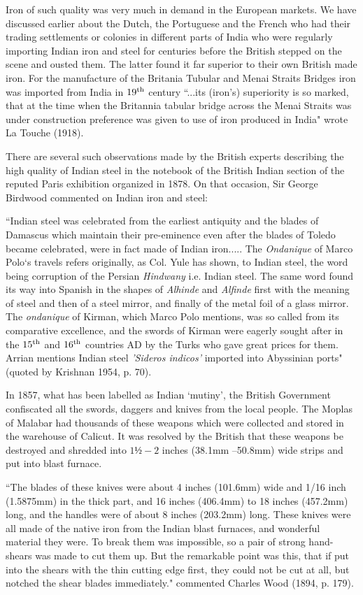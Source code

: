 Iron of such quality was very much in demand in the European markets.  We have discussed earlier about the Dutch, the Portuguese and the French who had their trading settlements or colonies in different parts of India who were regularly importing Indian iron and steel for centuries before the British stepped on the scene and ousted them.  The latter found it far superior to their own British made iron.  For the manufacture of the Britania Tubular and Menai Straits Bridges iron was imported from India in $19^{\rm th}$ century ``...its (iron's) superiority is so marked, that at the time when the Britannia tabular bridge across the Menai Straits was under construction preference was given to use of iron produced in India" wrote La Touche (1918).

There are several such observations made by the British experts describing the high quality of Indian steel in the notebook of the British Indian section of the reputed Paris exhibition organized in 1878. On that occasion, Sir George Birdwood commented on Indian iron and steel:

{\footnotesize{``Indian steel was celebrated from the earliest antiquity and the blades of Damascus which maintain their pre-eminence even after the blades of Toledo became celebrated, were in fact made of Indian iron..... The {\it Ondanique} of Marco Polo`s travels refers originally, as Col. Yule has shown, to Indian steel, the word being corruption of the Persian {\it Hindwany} i.e. Indian steel.  The same word found its way into Spanish in the shapes of {\it Alhinde} and {\it Alfinde} first with the meaning of steel and then of a steel mirror, and finally of the metal foil of a glass mirror.  The {\it ondanique} of Kirman, which Marco Polo mentions, was so called from its comparative excellence, and the swords of Kirman were eagerly sought after in the $15^{\rm th}$ and $16^{\rm th}$ countries AD by the Turks who gave great prices for them.  Arrian mentions Indian steel {\it 'Sideros indicos'} imported into Abyssinian ports"}} (quoted by Krishnan 1954, p. 70).

In 1857, what has been labelled as Indian `mutiny', the British Government confiscated all the swords, daggers and knives from the local people.  The Moplas of Malabar had thousands of these weapons which were collected and stored in the warehouse of Calicut. It was resolved by the British that these weapons be destroyed and shredded into $1½ - 2$ inches (38.1mm –50.8mm) wide strips and put into blast furnace. 

{\footnotesize{``The blades of these knives were about 4 inches (101.6mm) wide and 1/16 inch (1.5875mm) in the thick part, and 16 inches (406.4mm) to 18 inches (457.2mm) long, and the handles were of about 8 inches (203.2mm) long.  These knives were all made of the native iron from the Indian blast furnaces, and wonderful material they were.  To break them was impossible, so a pair of strong hand-shears was made to cut them up.  But the remarkable point was this, that if put into the shears with the thin cutting edge first, they could not be cut at all, but notched the shear blades immediately."}} commented Charles Wood (1894, p. 179).  


